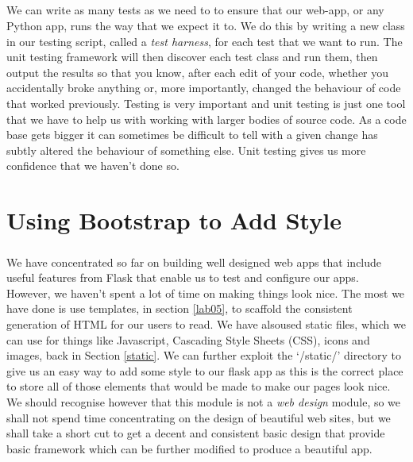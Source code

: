 \documentclass[12pt, a4paper, twoside]{book}
\begin{document}
\paragraph{} We can write as many tests as we need to to ensure that our web-app, or any Python app, runs the way that we expect it to. We do this by writing a new class in our testing script, called a \emph{test harness}, for each test that we want to run. The unit testing framework will then discover each test class and run them, then output the results so that you know, after each edit of your code, whether you accidentally broke anything or, more importantly, changed the behaviour of code that worked previously. Testing is very important and unit testing is just one tool that we have to help us with working with larger bodies of source code. As a code base gets bigger it can sometimes be difficult to tell with a given change has subtly altered the behaviour of something else. Unit testing gives us more confidence that we haven't done so.



\chapter{Using Bootstrap to Add Style}
\label{lab07}
\paragraph{} We have concentrated so far on building well designed web apps that include useful features from Flask that enable us to test and configure our apps. However, we haven't spent a lot of time on making things look nice. The most we have done is use templates, in section \ref{lab05}, to scaffold the consistent generation of HTML for our users to read. We have alsoused static files, which we can use for things like Javascript, Cascading Style Sheets (CSS), icons and images, back in Section \ref{static}. We can further exploit the `/static/' directory to give us an easy way to add some style to our flask app as this is the correct place to store all of those elements that would be made to make our pages look nice. We should recognise however that this module is not a \emph{web design} module, so we shall not spend time concentrating on the design of beautiful web sites, but we shall take a short cut to get a decent and consistent basic design that provide basic framework which can be further modified to produce a beautiful app.
\end{document}
